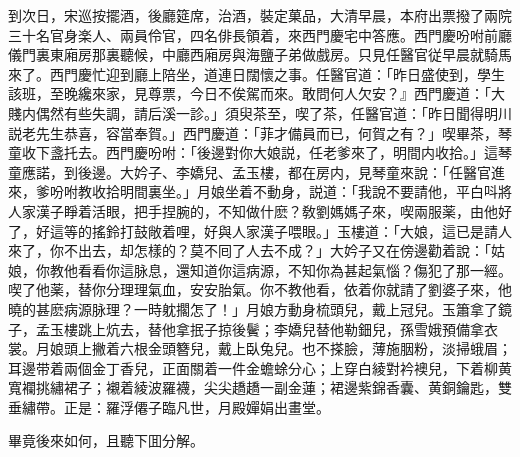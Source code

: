 到次日，宋巡按擺酒，後廳筵席，治酒，裝定菓品，大清早晨，本府出票撥了兩院三十名官身楽人、兩員伶官，四名俳長領着，來西門慶宅中答應。西門慶吩咐前廳儀門裏東廂房那裏聽候，中廳西廂房與海鹽子弟做戲房。只見任醫官従早晨就騎馬來了。西門慶忙迎到廳上陪坐，道連日闊懷之事。任醫官道：「昨日盛使到，學生該班，至晚纔來家，見尊票，今日不俟駕而來。敢問何人欠安？』西門慶道：「大賤内偶然有些失調，請后溪一診。」須臾茶至，喫了茶，任醫官道：「昨日聞得明川説老先生恭喜，容當奉賀。」西門慶道：「菲才備員而已，何賀之有？」喫畢茶，琴童收下盞托去。西門慶吩咐：「後邊對你大娘説，任老爹來了，明間内收拾。」這琴童應諾，到後邊。大妗子、李嬌兒、孟玉樓，都在房内，見琴童來說：「任醫官進來，爹吩咐教收拾明間裏坐。」月娘坐着不動身，説道：「我說不要請他，平白呌將人家漢子睜着活眼，把手捏腕的，不知做什麽？敎劉媽媽子來，喫兩服薬，由他好了，好這等的搖鈴打鼓敞着哩，好與人家漢子喂眼。」玉樓道：「大娘，這已是請人來了，你不出去，却怎樣的？莫不囘了人去不成？」大妗子又在傍邊勸着說：「姑娘，你教他看看你這脉息，還知道你這病源，不知你為甚起氣惱？傷犯了那一經。喫了他薬，替你分理理氣血，安安胎氣。你不教他看，依着你就請了劉婆子來，他曉的甚麽病源脉理？一時躭擱怎了！」月娘方動身梳頭兒，戴上冠兒。玉簫拿了鏡子，孟玉樓跳上炕去，替他拿抿子掠後鬢；李嬌兒替他勒鈿兒，孫雪娥預備拿衣裳。月娘頭上撇着六根金頭簪兒，戴上臥兔兒。也不搽臉，薄施胭粉，淡掃蛾眉；耳邊带着兩個金丁香兒，正面關着一件金蟾蜍分心；上穿白綾對衿襖兒，下着柳黄寬襴挑繡裙子；襯着綾波羅襪，尖尖趫趫一副金蓮；裙邊紫錦香囊、黄銅鑰匙，雙垂繡帶。正是：羅浮僊子臨凡世，月殿嬋娟出畫堂。

畢竟後來如何，且聽下囬分解。

